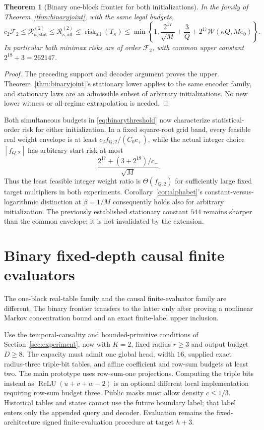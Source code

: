 \documentclass[11pt,letterpaper]{article}
\newtheorem{theorem}{Theorem}[section]
\theoremstyle{definition}\newtheorem{definition}[theorem]{Definition}
\theoremstyle{remark}\newtheorem{remark}[theorem]{Remark}
\newcommand{\ceil}[1]{\left\lceil #1\right\rceil}
\newcommand{\Risk}{\mathcal{R}}
\begin{document}
\begin{theorem}[Binary one-block frontier for both initializations]\label{thm:binaryall}
In the family of Theorem~\ref{thm:binaryjoint}, with the same legal budgets,
\begin{equation}\label{eq:binaryall}
 c_2\mathcal F_2\le
 \Risk_{\kappa,\mathrm{stat}}^{(2)}
 \le\Risk_{\kappa,\mathrm{all}}^{(2)}
 \le\operatorname{risk}_{\mathrm{all}}(T_\kappa)
 \le\min\left\{1,\frac{2^{17}}{\sqrt M}+\frac3Q+
 2^{17}\mathcal W(\kappa Q,Me_0)\right\}.
\end{equation}
In particular both minimax risks are of order $\mathcal F_2$, with common upper constant $2^{18}+3=262147$.
\end{theorem}
\begin{proof}
The preceding support and decoder argument proves the upper. Theorem~\ref{thm:binaryjoint}'s stationary lower applies to the same encoder family, and stationary laws are an admissible subset of arbitrary initializations. No new lower witness or all-regime extrapolation is needed.
\end{proof}

Both simultaneous budgets in \eqref{eq:binarythreshold} now characterize statistical-order risk for either initialization. In a fixed square-root grid band, every feasible real weight envelope is at least
$c_2f_{Q,2}/(C_0c_+)$, while the actual integer choice
$\ceil{f_{Q,2}}$ has arbitrary-start risk at most
\[
 \frac{2^{17}+(3+2^{18})/c_-}{\sqrt M}.
\]
Thus the least feasible integer weight ratio is $\Theta(f_{Q,2})$ for sufficiently large fixed target multipliers in both experiments. Corollary~\ref{cor:alphabet}'s constant-versus-logarithmic distinction at $\beta=1/M$ consequently holds also for arbitrary initialization. The previously established stationary constant $544$ remains sharper than the common envelope; it is not invalidated by the extension.

\section{Binary fixed-depth causal finite evaluators}\label{sec:binarycausal}
The one-block real-table family and the causal finite-evaluator family are different. The binary frontier transfers to the latter only after proving a nonlinear Markov concentration bound and an exact finite-label upper inclusion.

Use the temporal-causality and bounded-primitive conditions of Section~\ref{sec:experiment}, now with $K=2$, fixed radius $r\ge3$ and output budget $D\ge8$. The capacity must admit one global head, width $16$, supplied exact radius-three triple-bit tables, and affine coefficient and row-sum budgets at least two. The main prototype uses row-sum-one projections. Computing the triple bits instead as $\operatorname{ReLU}(u+v+w-2)$ is an optional different local implementation requiring row-sum budget three. Public masks must allow density $c\le1/3$. Historical tables and states cannot use the future boundary label; that label enters only the appended query and decoder. Evaluation remains the fixed-architecture signed finite-evaluation procedure at target $h+3$.
\end{document}

